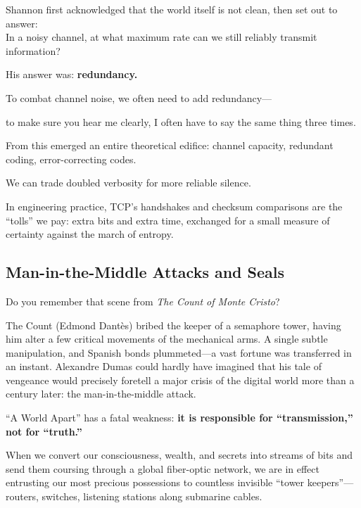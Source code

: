 \begin{myquote}
    Shannon first acknowledged that the world itself is not clean, then set out to answer:\\
    In a noisy channel, at what maximum rate can we still reliably transmit information?
\end{myquote}


His answer was: \textbf{redundancy.}

To combat channel noise, we often need to add redundancy---

to make sure you hear me clearly, I often have to say the same thing three times.

From this emerged an entire theoretical edifice: channel capacity, redundant coding, error-correcting codes.

We can trade doubled verbosity for more reliable silence.

\vspace{1em}

In engineering practice, TCP's handshakes and checksum comparisons are the ``tolls'' we pay: extra bits and extra time, exchanged for a small measure of certainty against the march of entropy.

\subsection{Man-in-the-Middle Attacks and Seals}

Do you remember that scene from \textit{The Count of Monte Cristo}?

The Count (Edmond Dant\`{e}s) bribed the keeper of a semaphore tower, having him alter a few critical movements of the mechanical arms. A single subtle manipulation, and Spanish bonds plummeted---a vast fortune was transferred in an instant.
Alexandre Dumas could hardly have imagined that his tale of vengeance would precisely foretell a major crisis of the digital world more than a century later: the man-in-the-middle attack.

\vspace{1em}

``A World Apart'' has a fatal weakness: \textbf{it is responsible for ``transmission,'' not for ``truth.''}

When we convert our consciousness, wealth, and secrets into streams of bits and send them coursing through a global fiber-optic network, we are in effect entrusting our most precious possessions to countless invisible ``tower keepers''---routers, switches, listening stations along submarine cables.

